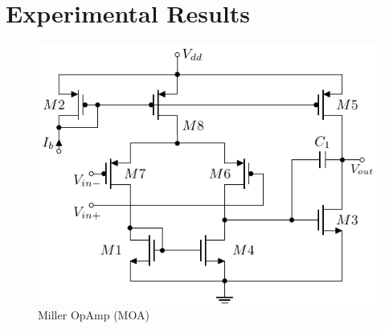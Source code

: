 \documentclass[conference]{IEEEtran}
\begin{document}
	
	
	\section{Experimental Results} \label{sec:results}
	\begin{figure}[]
		\centering
		\includegraphics[width=.5\linewidth]{figures/miller_pmos}
		\caption{Miller OpAmp (MOA)}
		\label{fig:miller}
	\end{figure}
	
\end{document}
